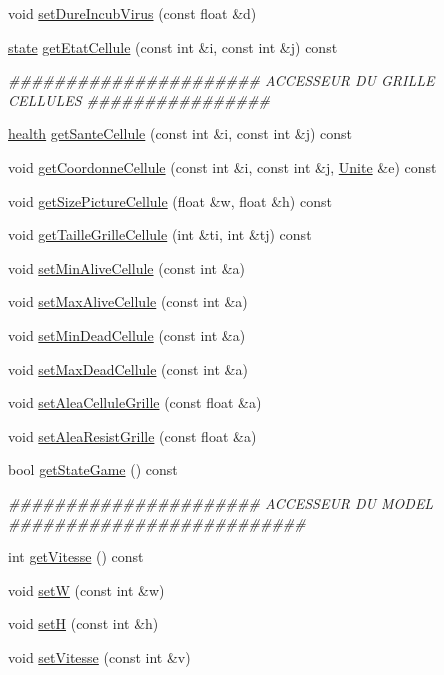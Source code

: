 \begin{DoxyCompactItemize}
\item 
void \hyperlink{classGameModel_a12eba0ada315699186957d19f2774d34}{setDureIncubVirus} (const float \&d)
\item 
\hyperlink{enum_8h_adc6e5733fc3c22f0a7b2914188c49c90}{state} \hyperlink{classGameModel_aec8153ce6c38f42cf23a9009590ad779}{getEtatCellule} (const int \&i, const int \&j) const 
\begin{DoxyCompactList}\small\item\em \#\#\#\#\#\#\#\#\#\#\#\#\#\#\#\#\#\#\#\#\#\# ACCESSEUR DU GRILLE CELLULES \#\#\#\#\#\#\#\#\#\#\#\#\#\#\#\# \end{DoxyCompactList}\item 
\hyperlink{enum_8h_ae2f10db0fed275ae9f323a3c41243971}{health} \hyperlink{classGameModel_a9551876b3078a972d18742915db40046}{getSanteCellule} (const int \&i, const int \&j) const 
\item 
void \hyperlink{classGameModel_af610b94bbfff99af35e7b02a369cccb0}{getCoordonneCellule} (const int \&i, const int \&j, \hyperlink{classUnite}{Unite} \&e) const 
\item 
void \hyperlink{classGameModel_af42707551e007252b2be6f0c7ba70fc1}{getSizePictureCellule} (float \&w, float \&h) const 
\item 
void \hyperlink{classGameModel_a7b3430c2bfe5ea6f02ce482a1a9182d4}{getTailleGrilleCellule} (int \&ti, int \&tj) const 
\item 
void \hyperlink{classGameModel_a690f8711b48406813e9dbb500d35a969}{setMinAliveCellule} (const int \&a)
\item 
void \hyperlink{classGameModel_a7486a95cdc549dc8ba8094ed9077a754}{setMaxAliveCellule} (const int \&a)
\item 
void \hyperlink{classGameModel_accedd7d41a3195b8df223579ba3723d0}{setMinDeadCellule} (const int \&a)
\item 
void \hyperlink{classGameModel_a48a22006ff2b7ad732a0d832125ea4b9}{setMaxDeadCellule} (const int \&a)
\item 
void \hyperlink{classGameModel_a6ce632a9106c64e1f1a9adce20463c76}{setAleaCelluleGrille} (const float \&a)
\item 
void \hyperlink{classGameModel_a8481df3eec40f157b89282b835ad9b99}{setAleaResistGrille} (const float \&a)
\item 
bool \hyperlink{classGameModel_ae19edae79172b9940de8512475f24285}{getStateGame} () const 
\begin{DoxyCompactList}\small\item\em \#\#\#\#\#\#\#\#\#\#\#\#\#\#\#\#\#\#\#\#\#\# ACCESSEUR DU MODEL \#\#\#\#\#\#\#\#\#\#\#\#\#\#\#\#\#\#\#\#\#\#\#\#\#\# \end{DoxyCompactList}\item 
int \hyperlink{classGameModel_aada639d28c6970eccfb39052ae5b30fc}{getVitesse} () const 
\item 
void \hyperlink{classGameModel_af9af819b92fc3f112c9f7cafd0511893}{setW} (const int \&w)
\item 
void \hyperlink{classGameModel_a352b2d47b2ae6c217a8dfbb87d36b7e2}{setH} (const int \&h)
\item 
void \hyperlink{classGameModel_adcad97e296061f05d240206df7194efa}{setVitesse} (const int \&v)
\end{DoxyCompactItemize}
